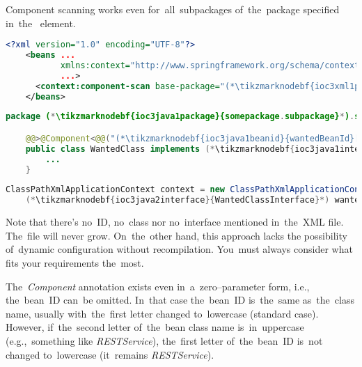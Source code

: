Component scanning works even for~all~subpackages of~the~package specified in~the~ element.
\newpage

\begin{lstlisting}[language=XML, title={Configuration XML}]
    <?xml version="1.0" encoding="UTF-8"?>
    <beans ...
           xmlns:context="http://www.springframework.org/schema/context"
           ...>
      <context:component-scan base-package="(*\tikzmarknodebf{ioc3xml1package}{somepackage.subpackage}[ForestGreen]*)"/>
    </beans>
\end{lstlisting}
\begin{lstlisting}[language=Java, title={Wanted class}]
    package (*\tikzmarknodebf{ioc3java1package}{somepackage.subpackage}*).subsubpackage;

    @@>@Component<@@("(*\tikzmarknodebf{ioc3java1beanid}{wantedBeanId}[ForestGreen]*)")
    public class WantedClass implements (*\tikzmarknodebf{ioc3java1interface}{WantedClassInterface}*) {
        ...
    }
\end{lstlisting}
\begin{lstlisting}[language=Java, title={Usage}]
    ClassPathXmlApplicationContext context = new ClassPathXmlApplicationContext("configurationFile.xml");
    (*\tikzmarknodebf{ioc3java2interface}{WantedClassInterface}*) wantedClassInstance = context.getBean("(*\tikzmarknodebf{ioc3java2beanid}{wantedBeanId}[ForestGreen]*)", (*\tikzmarknodebf{ioc3java2interface2}{WantedClassInterface}*).class);
\end{lstlisting}

\noindent Note that there's no~ID, no~class nor no~interface mentioned in~the~XML file.
The~file will never grow.
On~the~other hand, this approach  lacks the possibility of~dynamic configuration without recompilation.
You~must always consider what fits your requirements the~most.

The~\textit{Component} annotation exists even in~a~zero--parameter form, i.e., the~bean~ID can~be omitted.
In~that case the~bean~ID is~the~same as~the~class name, usually with~the~first letter changed to~lowercase (standard case).
However, if~the~second letter of~the~bean class name is~in~uppercase (e.g.,~something like \textit{\mbox{RESTService}}), the~first letter of~the~bean~ID is~not changed to~lowercase (it~remains \textit{\mbox{RESTService}}).
\newpage

